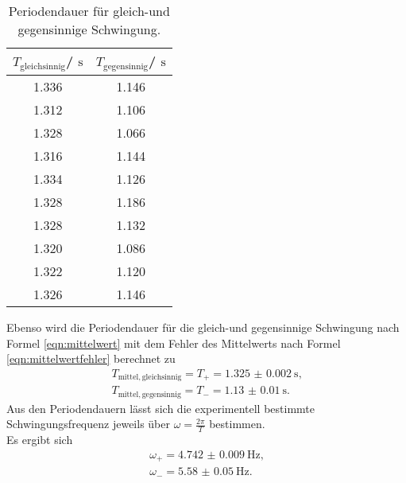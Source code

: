 \begin{table}
	\centering
	\caption{Periodendauer für gleich-und gegensinnige Schwingung.}
	\label{tab:gleichgegen}
	\begin{tabular}{cc}
		\toprule
		$T_{\mathrm{gleichsinnig}}$/ $\si{\second}$ & $T_{\mathrm{gegensinnig}}$/ $\si{\second}$ \\
		\midrule
		1.336                                       & 1.146                                      \\
		1.312                                       & 1.106                                      \\
		1.328                                       & 1.066                                      \\
		1.316                                       & 1.144                                      \\
		1.334                                       & 1.126                                      \\
		1.328                                       & 1.186                                      \\
		1.328                                       & 1.132                                      \\
		1.320                                       & 1.086                                      \\
		1.322                                       & 1.120                                      \\
		1.326                                       & 1.146                                      \\
		\bottomrule
	\end{tabular}
\end{table}
Ebenso wird die Periodendauer für die gleich-und gegensinnige Schwingung nach Formel \eqref{eqn:mittelwert} mit dem Fehler des Mittelwerts nach Formel \eqref{eqn:mittelwertfehler} berechnet zu
\begin{gather*}
	T_{\mathrm{mittel, gleichsinnig}}=T_{\mathrm{+}}=\SI{1.325(2)}{\second} \text{,}\\
	T_{\mathrm{mittel, gegensinnig}}=T_{\mathrm{-}} =\SI{1.13(1)}{\second} \text{.}
\end{gather*}
Aus den Periodendauern lässt sich die experimentell bestimmte Schwingungsfrequenz jeweils über $\omega=\frac{2\pi}{T}$ bestimmen.
\\Es ergibt sich
\begin{gather*}
	\omega_{\mathrm{+}}= \SI{4.742(9)}{\Hz} \text{,}\\
	\omega_{\mathrm{-}}= \SI{5.58(5)}{\Hz} \text{.}
\end{gather*}
